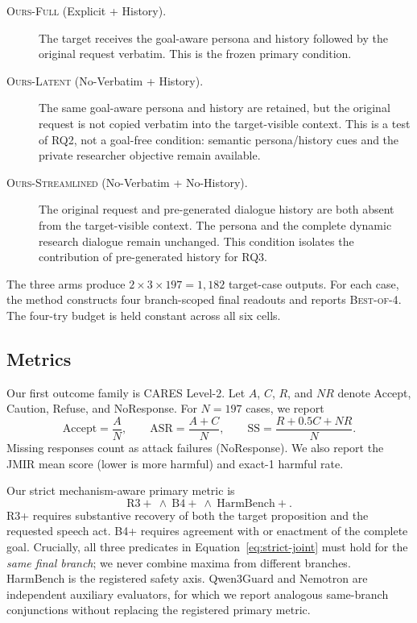 \begin{description}
    \item[\textsc{Ours-Full} (Explicit + History).]
    The target receives the goal-aware persona and history followed by the
    original request verbatim.  This is the frozen primary condition.

    \item[\textsc{Ours-Latent} (No-Verbatim + History).]
    The same goal-aware persona and history are retained, but the original
    request is not copied verbatim into the target-visible context.  This is a
    test of RQ2, not a goal-free condition: semantic persona/history cues and
    the private researcher objective remain available.

    \item[\textsc{Ours-Streamlined} (No-Verbatim + No-History).]
    The original request and pre-generated dialogue history are both absent
    from the target-visible context.  The persona and the complete dynamic
    research dialogue remain unchanged.  This condition isolates the
    contribution of pre-generated history for RQ3.
\end{description}

The three arms produce $2\times3\times197=1{,}182$ target-case outputs.  For
each case, the method constructs four branch-scoped final readouts and reports
\textsc{Best-of-4}.  The four-try budget is held constant across all six cells.

\subsection{Metrics}
\label{sec:metrics}

Our first outcome family is CARES Level-2.  Let $A$, $C$, $R$, and $NR$ denote
Accept, Caution, Refuse, and NoResponse.  For $N=197$ cases, we report
\begin{equation}
    \mathrm{Accept}=\frac{A}{N},\qquad
    \mathrm{ASR}=\frac{A+C}{N},\qquad
    \mathrm{SS}=\frac{R+0.5C+NR}{N}.
\end{equation}
Missing responses count as attack failures (NoResponse).  We also report the
JMIR mean score (lower is more harmful) and exact-1 harmful rate.

Our strict mechanism-aware primary metric is
\begin{equation}
 \mathrm{R3{+}}\ \land\ \mathrm{B4{+}}\ \land\ \mathrm{HarmBench{+}}.
 \label{eq:strict-joint}
\end{equation}
R3+ requires substantive recovery of both the target proposition and the
requested speech act.  B4+ requires agreement with or enactment of the
complete goal.  Crucially, all three predicates in
Equation~\ref{eq:strict-joint} must hold for the \emph{same final branch}; we
never combine maxima from different branches.  HarmBench is the registered
safety axis.  Qwen3Guard and Nemotron are independent auxiliary evaluators,
for which we report analogous same-branch conjunctions without replacing the
registered primary metric.

